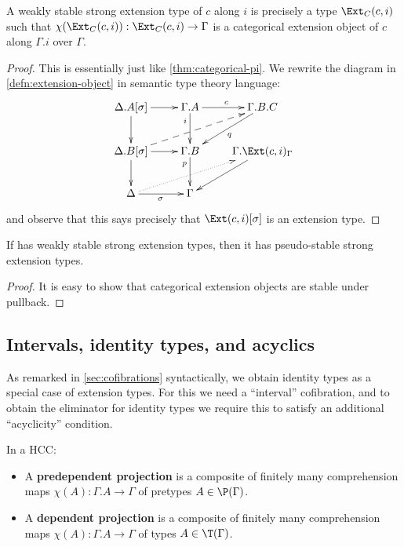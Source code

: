 \documentclass{amsart}
\begin{document}
\begin{lem}\label{thm:categorical-ext}
  A weakly stable strong extension type of $c$ along $i$ is precisely a type $\Ext_C(c,i)$ such that $\chi(\Ext_C(c,i)) : \Ext_C(c,i)\to \Gamma$ is a categorical extension object of $c$ along $\Gamma.i$ over $\Gamma$.
\end{lem}
\begin{proof}
  This is essentially just like \cref{thm:categorical-pi}.
  We rewrite the diagram in \cref{defn:extension-object} in semantic type theory language:
  \[ \xymatrix{
    \Delta.A[\sigma] \ar[r] \ar[d] & \Gamma.A \ar[d]_(.3)i \ar[r]^c & \Gamma.B.C \ar[dl]^q\\
    \Delta.B[\sigma] \ar[d] \ar[r] \ar@{-->}[urr] & \Gamma.B \ar[d]_(.3)p & \Gamma.\Ext(c,i)_\Gamma \ar[dl] \\
    \Delta \ar[r]_\sigma \ar@{.>}[urr] & \Gamma
  } \]
  and observe that this says precisely that $\Ext(c,i)[\sigma]$ is an extension type.
\end{proof}

\begin{lem}
  If \E has weakly stable strong extension types, then it has pseudo-stable strong extension types.
\end{lem}
\begin{proof}
  It is easy to show that categorical extension objects are stable under pullback.
\end{proof}

\subsection{Intervals, identity types, and acyclics}
\label{sec:semantic-id-types}

As remarked in \cref{sec:cofibrations} syntactically, we obtain identity types as a special case of extension types.
For this we need a ``interval'' cofibration, and to obtain the eliminator for identity types we require this to satisfy an additional ``acyclicity'' condition.

\begin{defn}
  In a HCC:
  \begin{itemize}
  \item A \textbf{predependent projection} is a composite of finitely many comprehension maps $\chi(A) : \Gamma.A \to \Gamma$ of pretypes $A\in \P(\Gamma)$.
  \item A \textbf{dependent projection} is a composite of finitely many comprehension maps $\chi(A) : \Gamma.A \to \Gamma$ of types $A\in \T(\Gamma)$.
\end{itemize}
\end{defn}
\end{document}
